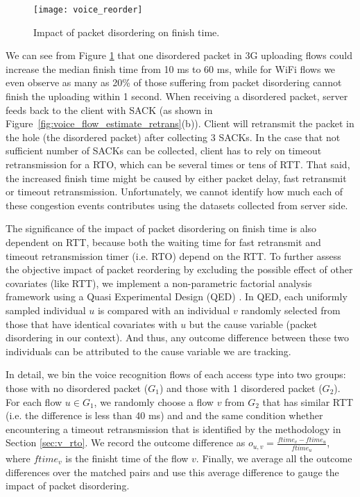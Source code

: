 \begin{figure}[th]
\centering
	\texttt{[image: voice\_reorder]}
\caption{Impact of packet disordering on finish time.}
\label{fig:voice_reorder}
\end{figure}

We can see from Figure \ref{fig:voice_reorder} that one disordered packet in 3G uploading flows could increase the median finish time from 10 ms to 60 ms, while for WiFi flows we even observe as many as 20\% of those suffering from packet disordering cannot finish the uploading within 1 second. When receiving a disordered packet, server feeds back to the client with SACK (as shown in Figure~\ref{fig:voice_flow_estimate_retrans}(b)). Client will retransmit the packet in the hole (\ie the disordered packet) after collecting 3 SACKs. In the case that not sufficient number of SACKs can be collected, client has to rely on timeout retransmission for a RTO, which can be several times or tens of RTT. That said, the increased finish time might be caused by either packet delay, fast retransmit or timeout retransmission. Unfortunately, we cannot identify how much each of these congestion events contributes using the datasets collected from server side.

The significance of the impact of packet disordering on finish time is also dependent on RTT, because both the waiting time for fast retransmit and timeout retransmission timer (i.e. RTO) depend on the RTT. To further assess the objective impact of packet reordering by excluding the possible effect of other covariates (like RTT), we implement a non-parametric factorial analysis framework using a Quasi Experimental Design (QED) \cite{krishnan2013video}. In QED, each uniformly sampled individual $u$ is compared with an individual $v$ randomly selected from those that have identical covariates with $u$ but the cause variable (packet disordering in our context). And thus, any outcome difference between these two individuals can be attributed to the cause variable we are tracking. 

In detail, we bin the voice recognition flows of each access type into two groups: those with no disordered packet ($G_1$) and those with 1 disordered packet ($G_2$). For each flow $u \in G_1$, we randomly choose a flow $v$ from $G_2$ that has similar RTT (i.e. the difference is less than 40 ms) and and the same condition whether encountering a timeout retransmission that is identified by the methodology in Section \ref{sec:v_rto}. We record the outcome difference as $o_{u,v} = \frac{ftime_{v} - ftime_{u}}{ftime_{u}}$, where $ftime_v$ is the finisht time of the flow $v$. Finally, we average all the outcome differences over the matched pairs and use this average difference to gauge the impact of packet disordering.

